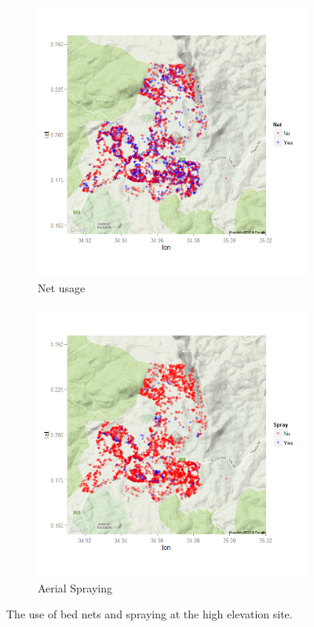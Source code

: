 \documentclass{article}\usepackage[]{graphicx}\usepackage[]{color}
\begin{document}
\begin{figure}
\centering
\begin{subfigure}[b]{.48\textwidth}
\includegraphics[width=\textwidth]{./figure/High_nets}
\caption{Net usage}
\end{subfigure}
\begin{subfigure}[b]{.48\textwidth}
\includegraphics[width=\textwidth]{./figure/High_spray}
\caption{Aerial Spraying}
\end{subfigure}
\caption{The use of bed nets and spraying at the high elevation site.}
\label{high}
\end{figure}
\end{document}
